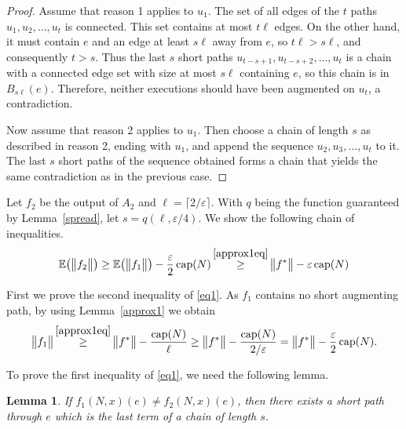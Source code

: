 \documentclass[12pt,a4paper]{article}
\newtheorem{Lemma}[Theorem]{Lemma}
\newcommand{\capp}{\operatorname{cap}}
\newcommand{\eps}{\varepsilon}
\newcommand{\E}{\mathbb{E}}
\renewcommand{\:}{\colon}
\begin{document}
\begin{proof}
Assume that reason 1 applies to $u_1$.
The set of all edges of the $t$ paths $u_1, u_2, \ldots,  u_t$ is connected. 
This set contains at most $t\ell$ edges. 
On the other hand, it must contain $e$ and an edge at least $s\ell$ away from $e$, so $t\ell > s\ell$, and consequently $t > s$. Thus the last $s$ short paths $u_{t-s+1}, u_{t-s+2}, \ldots, u_t$ is a chain with a connected edge set with size at most $s\ell$ containing $e$, so this chain is in $B_{s\ell}(e)$. 
Therefore, neither executions should have been augmented on $u_t$, a contradiction. 

Now assume that reason 2 applies to $u_1$. 
Then choose a chain of length $s$ as described in reason 2, ending with $u_1$, and append the sequence $u_2, u_3, \ldots,  u_t$ to it. 
The last $s$ short paths of the sequence obtained forms a chain that yields the same contradiction as in the previous case.
\end{proof}

Let $f_2$ be the output of $A_2$ and $\ell = \lceil 2/\eps\rceil$. 
With $q$ being the function guaranteed by Lemma~\ref{spread}, let $s = q(\ell, \eps/4)$. 
We show the following chain of inequalities. 
\begin{equation} \label{eq1}
\E\big(\big\|f_2\big\|\big) \ge \E\big(\big\|f_1\big\|\big) - \frac{\eps}{2} \capp(N) \mathop{\ge}^{\eqref{approx1eq}} \big\|f^*\big\| - \eps \capp(N)
\end{equation}

First we prove the second inequality of \eqref{eq1}.
As $f_1$ contains no short augmenting path, by using Lemma~\ref{approx1} we obtain
\begin{equation*}
\big\|f_1\big\| \mathop{\ge}^{\eqref{approx1eq}} \big\|f^*\big\| - \frac{\capp(N)}{\ell} \geq \big\|f^*\big\| - \frac{\capp(N)}{2/\eps} = \big\|f^*\big\| - \frac{\eps}{2} \capp(N).
\end{equation*}

To prove the first inequality of \eqref{eq1}, we need the following lemma.

\begin{Lemma} \label{diff}
If $f_1(N,x)(e) \neq f_2(N,x)(e)$, then there exists a short path through $e$ which is the last term of a chain of length $s$.
\end{Lemma}
\end{document}
